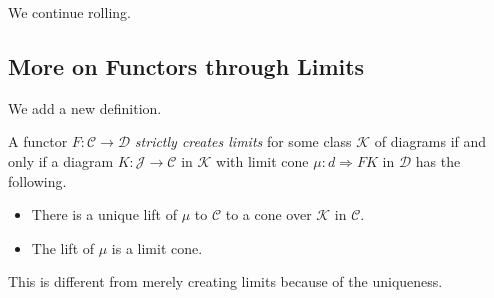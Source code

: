 \documentclass[../notes.tex]{subfiles}
\begin{document}

We continue rolling.

\subsection{More on Functors through Limits}
We add a new definition.
\begin{definition}
	A functor $F:\mathcal C\to\mathcal D$ \textit{strictly creates limits} for some class $\mathcal K$ of diagrams if and only if a diagram $K:\mathcal J\to\mathcal C$ in $\mathcal K$ with limit cone $\mu:d\Rightarrow FK$ in $\mathcal D$ has the following.
	\begin{itemize}
		\item There is a unique lift of $\mu$ to $\mathcal C$ to a cone over $\mathcal K$ in $\mathcal C$.
		\item The lift of $\mu$ is a limit cone.
	\end{itemize}
\end{definition}
This is different from merely creating limits because of the uniqueness.
\end{document}
